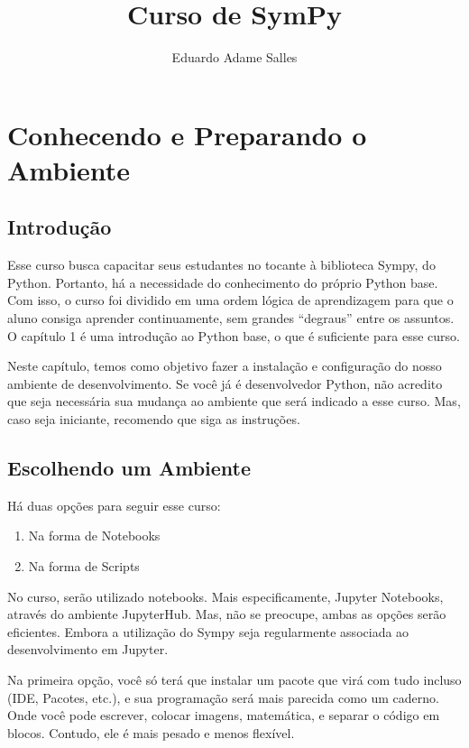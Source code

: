\documentclass[11pt, brazilian]{article}
\title{Curso de SymPy}
\author{Eduardo Adame Salles}
\providecommand{\tightlist}{%
      \setlength{\itemsep}{0pt}\setlength{\parskip}{0pt}}
\begin{document}
    
    
    \newpage
    \tableofcontents
    \newpage
    
    \hypertarget{conhecendo-e-preparando-o-ambiente}{%
\section{Conhecendo e Preparando o
Ambiente}\label{conhecendo-e-preparando-o-ambiente}}

\hypertarget{introduuxe7uxe3o}{%
\subsection{Introdução}\label{introduuxe7uxe3o}}

Esse curso busca capacitar seus estudantes no tocante à biblioteca
Sympy, do Python. Portanto, há a necessidade do conhecimento do próprio
Python base. Com isso, o curso foi dividido em uma ordem lógica de
aprendizagem para que o aluno consiga aprender continuamente, sem
grandes ``degraus'' entre os assuntos. O capítulo 1 é uma introdução ao
Python base, o que é suficiente para esse curso.

Neste capítulo, temos como objetivo fazer a instalação e configuração do
nosso ambiente de desenvolvimento. Se você já é desenvolvedor Python,
não acredito que seja necessária sua mudança ao ambiente que será
indicado a esse curso. Mas, caso seja iniciante, recomendo que siga as
instruções.

\hypertarget{escolhendo-um-ambiente}{%
\subsection{Escolhendo um Ambiente}\label{escolhendo-um-ambiente}}

Há duas opções para seguir esse curso:

\begin{enumerate}
\def\labelenumi{\arabic{enumi}.}
\tightlist
\item
  Na forma de Notebooks
\item
  Na forma de Scripts
\end{enumerate}

No curso, serão utilizado notebooks. Mais especificamente, Jupyter
Notebooks, através do ambiente JupyterHub. Mas, não se preocupe, ambas
as opções serão eficientes. Embora a utilização do Sympy seja
regularmente associada ao desenvolvimento em Jupyter.

Na primeira opção, você só terá que instalar um pacote que virá com tudo
incluso (IDE, Pacotes, etc.), e sua programação será mais parecida como
um caderno. Onde você pode escrever, colocar imagens, matemática, e
separar o código em blocos. Contudo, ele é mais pesado e menos flexível.
\end{document}

